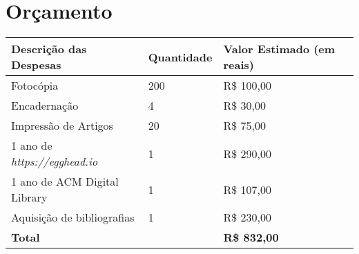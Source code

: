 \section{Orçamento}\label{lorcamento}

\begin{center}
  \tiny
  \begin{tabular}{| l | l | l | l |}
  \hline
  \textbf{Descrição das Despesas} & \textbf{Quantidade} & \textbf{Valor Estimado (em reais)} \\ \hline
  Fotocópia & 200 & R\$ 100,00 \\ \hline
  Encadernação & 4 & R\$ 30,00 \\ \hline
  Impressão de Artigos & 20 & R\$ 75,00 \\ \hline
  1 ano de \emph{https://egghead.io} & 1 & R\$ 290,00 \\ \hline
  1 ano de ACM Digital Library & 1 & R\$ 107,00 \\ \hline
  Aquisição de bibliografias & 1 & R\$ 230,00 \\
  \hline \hline
  \textbf{Total} & & \textbf{R\$ 832,00} \\
  \hline
  \end{tabular}
\end{center}
